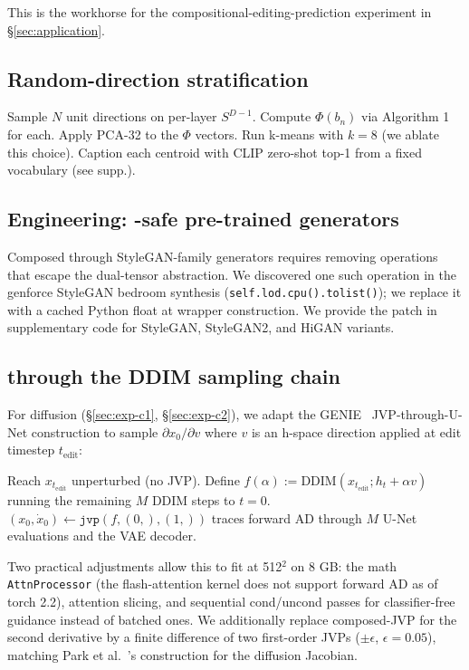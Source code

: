 This is the workhorse for the compositional-editing-prediction
experiment in \S\ref{sec:application}.

\subsection{Random-direction stratification}
\begin{algorithmic}
\STATE Sample $N$ unit directions on per-layer $S^{D-1}$.
\STATE Compute $\Phi(b_n)$ via Algorithm 1 for each.
\STATE Apply PCA-32 to the $\Phi$ vectors.
\STATE Run k-means with $k = 8$ (we ablate this choice).
\STATE Caption each centroid with CLIP zero-shot top-1 from a fixed
       vocabulary (see supp.).
\end{algorithmic}

\subsection{Engineering: \jvp-safe pre-trained generators}
Composed \jvp through StyleGAN-family generators requires removing
operations that escape the dual-tensor abstraction. We discovered
one such operation in the genforce StyleGAN bedroom synthesis
(\texttt{self.lod.cpu().tolist()}); we replace it with a cached
Python float at wrapper construction. We provide the patch in
supplementary code for StyleGAN, StyleGAN2, and HiGAN variants.

\subsection{\jvp through the DDIM sampling chain}
For diffusion (\S\ref{sec:exp-c1}, \S\ref{sec:exp-c2}), we adapt the
GENIE~\cite{Dockhorn2022GENIE} JVP-through-U-Net construction to
sample $\partial x_0 / \partial v$ where $v$ is an h-space direction
applied at edit timestep $t_{\text{edit}}$:
\begin{algorithmic}
\STATE Reach $x_{t_{\text{edit}}}$ unperturbed (no JVP).
\STATE Define $f(\alpha) := \text{DDIM}(x_{t_{\text{edit}}}; h_t + \alpha v)$
       running the remaining $M$ DDIM steps to $t=0$.
\STATE $(x_0, \dot x_0) \leftarrow \texttt{jvp}(f, (0,), (1,))$
       traces forward AD through $M$ U-Net evaluations and the VAE
       decoder.
\end{algorithmic}
Two practical adjustments allow this to fit at 512$^2$ on 8 GB:
the math \texttt{AttnProcessor} (the flash-attention kernel does not
support forward AD as of torch 2.2), attention slicing, and
sequential cond/uncond passes for classifier-free guidance instead
of batched ones. We additionally replace composed-JVP for the
second derivative by a finite difference of two first-order JVPs
($\pm\epsilon$, $\epsilon = 0.05$), matching Park et
al.~\cite{Park2023Riemannian}'s construction for the diffusion
Jacobian.


